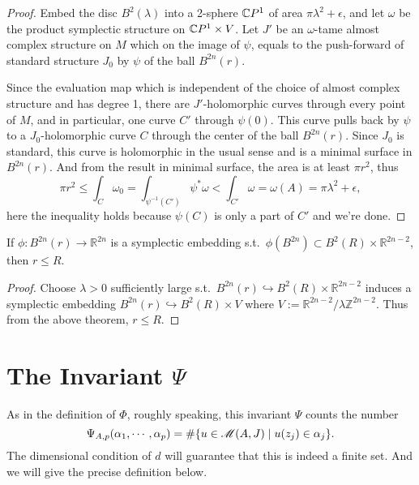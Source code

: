 \documentclass[twoside]{article}
\begin{document}
\begin{proof}
    Embed the disc $B^2(\lambda)$ into a 2-sphere $\mathbb{C}P^{1}$ of area $\pi\lambda^2+\epsilon$, 
    and let $\omega$ be the product symplectic structure on $\mathbb{C}P^{1}\times V$. 
    Let $J'$ be an $\omega$-tame almost complex structure on $M$ which on the image of $\psi$, 
    equals to the push-forward of standard structure $J_0$ by $\psi$ of the ball $B^{2n}(r)$.
    
    Since the evaluation map which is independent of the choice of 
    almost complex structure and has degree 1, 
    there are $J'$-holomorphic curves through every point of $M$, 
    and in particular, one curve $C'$ through $\psi(0)$. 
    This curve pulls back by $\psi$ to a $J_0$-holomorphic curve $C$ through 
    the center of the ball $B^{2n}(r)$. Since $J_0$ is standard, 
    this curve is holomorphic in the usual sense and is a minimal surface in $B^{2n}(r)$. 
    And from the result in minimal surface, the area is at least $\pi r^2$, thus
    \[\pi r^2\leq\int_C \omega_0=\int_{\psi^{-1}(C')}\psi^*\omega<\int_{C'}\omega=\omega(A)=\pi\lambda^2+\epsilon,\]
    here the inequality holds because $\psi(C)$ is only a part of $C'$ and we're done.
\end{proof}

\begin{theorem}[Gromov]
    If $\phi \colon B^{2n}(r)\rightarrow \mathbb{R}^{2n}$ is a symplectic embedding 
    s.t.\ $\phi(B^{2n})\subset B^2(R)\times \mathbb{R}^{2n-2}$, then $r\leq R$.
\end{theorem}

\begin{proof}
    Choose $\lambda>0$ sufficiently large s.t.\ 
    $B^{2n}(r)\hookrightarrow B^2(R)\times \mathbb{R}^{2n-2}$ 
    induces a symplectic embedding $B^{2n}(r)\hookrightarrow B^2(R)\times V$ 
    where $V:=\mathbb{R}^{2n-2}/\lambda \mathbb{Z}^{2n-2}$. 
    Thus from the above theorem, $r\leq R$.
\end{proof}

\section{The Invariant \texorpdfstring{$\Psi$}{Ψ}}

As in the definition of $\Phi$, roughly speaking, this invariant $\Psi$ counts the number
\[\Psi_{A,p}(\alpha_1,\cdots,\alpha_p)=\#\{ u\in\mathscr{M}(A,J)\mid u(z_j)\in\alpha_j  \}.\]
The dimensional condition of $d$ will guarantee that this is indeed a finite set. 
And we will give the precise definition below.
\end{document}
